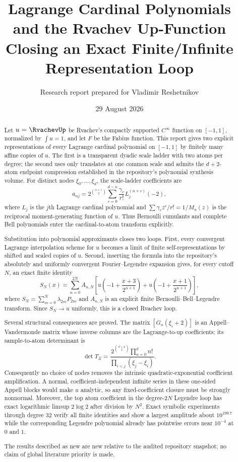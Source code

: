 \documentclass[11pt,oneside]{article}
\title{\bfseries Lagrange Cardinal Polynomials and the Rvachev Up-Function\\[0.4em]
\Large Closing an Exact Finite/Infinite Representation Loop}
\author{Research report prepared for Vladimir Reshetnikov}
\date{29 August 2026}
\theoremstyle{definition}
\theoremstyle{remark}
\begin{document}
\maketitle

\begin{abstract}
Let $u=\RvachevUp$ be Rvachev's compactly supported $C^\infty$ function on
$[-1,1]$, normalized by $\int u=1$, and let $F$ be the Fabius function.
This report gives two explicit representations of every Lagrange cardinal
polynomial on $[-1,1]$ by finitely many affine copies of $u$.
The first is a transparent dyadic scale ladder with two atoms per degree;
the second uses only translates at one common scale and admits the
$d+2$-atom endpoint compression established in the repository's polynomial
synthesis volume.  For distinct nodes $\xi_0,\ldots,\xi_d$, the scale-ladder
coefficients are
\[
 a_{nj}=2^{\binom{n+1}{2}}
 \sum_{r=0}^{d-n}\frac{\gamma_r}{r!}
 L_j^{(n+r)}(-2),
\]
where $L_j$ is the $j$th Lagrange cardinal polynomial and
$\sum\gamma_rz^r/r!=1/M_u(z)$ is the reciprocal moment-generating function
of $u$.  Thus Bernoulli cumulants and complete Bell polynomials enter the
cardinal-to-atom transform explicitly.

Substitution into polynomial approximants closes two loops.  First, every
convergent Lagrange interpolation scheme for $u$ becomes a limit of finite
self-representations by shifted and scaled copies of $u$.  Second, inserting
the formula into the repository's absolutely and uniformly convergent
Fourier--Legendre expansion gives, for every cutoff $N$, an exact finite
identity
\[
 S_N(x)=\sum_{n=0}^{2N}A_{n,N}\left[
 u\!\left(-1+\frac{x+3}{2^{n+1}}\right)+
 u\!\left(-1+\frac{x+1}{2^{n+1}}\right)\right],
\]
where $S_N=\sum_{m=0}^{N}\lambda_{2m}P_{2m}$ and $A_{n,N}$ is an explicit
finite Bernoulli--Bell--Legendre transform.  Since $S_N\to u$ uniformly,
this is a closed Rvachev loop.

Several structural consequences are proved.  The matrix
$[G_n(\xi_i+2)]$ is an Appell--Vandermonde matrix whose inverse columns are
the Lagrange-to-up coefficients; its sample-to-atom determinant is
\[
 \det T_\Xi=
 \frac{2^{\binom{d+2}{3}}\prod_{n=0}^{d}n!}
 {\prod_{i<j}(\xi_j-\xi_i)}.
\]
Consequently no choice of nodes removes the intrinsic quadratic-exponential
coefficient amplification.  A normal, coefficient-independent infinite
series in these one-sided Appell blocks would make $u$ analytic, so any
fixed-coefficient closure must be strongly nonnormal.  Moreover, the top
atom coefficient in the degree-$2N$ Legendre loop has exact logarithmic
limsup $2\log 2$ after division by $N^2$.  Exact symbolic experiments through
degree $32$ verify all finite identities and show a largest amplitude about
$10^{199.7}$ while the corresponding Legendre polynomial already has
pointwise errors near $10^{-4}$ at $0$ and $1$.

The results described as new are new relative to the audited repository
snapshot; no claim of global literature priority is made.
\end{abstract}
\end{document}
